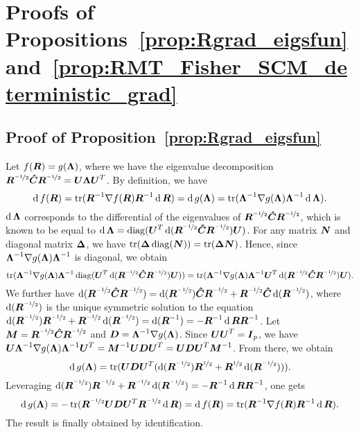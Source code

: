 \section{Proofs of Propositions~\ref{prop:Rgrad_eigsfun} and~\ref{prop:RMT_Fisher_SCM_deterministic_grad}}
\label{app:proofs}

\subsection{Proof of Proposition~\ref{prop:Rgrad_eigsfun}}

Let $f(\point) = g(\eigsMat)$, where we have the eigenvalue decomposition $\point^{\nicefrac{-1}2}\SCM\point^{\nicefrac{-1}2}=\MAT{U}\eigsMat\MAT{U}^T$.
By definition, we have
$$
    \diff f(\point) = \tr(\point^{-1}\grad f(\point)\point^{-1}\diff\point)
    = \diff g(\eigsMat) = \tr(\eigsMat^{-1}\grad g(\eigsMat)\eigsMat^{-1}\diff\eigsMat).
$$
$\diff\eigsMat$ corresponds to the differential of the eigenvalues of $\point^{\nicefrac{-1}2}\SCM\point^{\nicefrac{-1}2}$, which is known to be equal to $\diff\eigsMat=\diag(\MAT{U}^T\diff(\point^{\nicefrac{-1}2}\SCM\point^{\nicefrac{-1}2})\MAT{U})$.
For any matrix $\MAT{N}$ and diagonal matrix $\MAT{\Delta}$, we have $\tr(\MAT{\Delta}\diag(\MAT{N})) = \tr(\MAT{\Delta}\MAT{N})$.
Hence, since $\eigsMat^{-1}\grad g(\eigsMat)\eigsMat^{-1}$ is diagonal, we obtain
$$
     \tr(\eigsMat^{-1}\grad g(\eigsMat)\eigsMat^{-1}\diag(\MAT{U}^T\diff(\point^{\nicefrac{-1}2}\SCM\point^{\nicefrac{-1}2})\MAT{U}))
     =
     \tr(\eigsMat^{-1}\grad g(\eigsMat)\eigsMat^{-1}\MAT{U}^T\diff(\point^{\nicefrac{-1}2}\SCM\point^{\nicefrac{-1}2})\MAT{U}).
$$
We further have
$\diff(\point^{\nicefrac{-1}2}\SCM\point^{\nicefrac{-1}2})=\diff(\point^{\nicefrac{-1}2})\SCM\point^{\nicefrac{-1}2} + \point^{\nicefrac{-1}2}\SCM\diff(\point^{\nicefrac{-1}2})$,
where $\diff(\point^{\nicefrac{-1}2})$ is the unique symmetric solution to the equation
$\diff(\point^{\nicefrac{-1}2})\point^{\nicefrac{-1}2} + \point^{\nicefrac{-1}2}\diff(\point^{\nicefrac{-1}2}) = \diff(\point^{-1})=-\point^{-1}\diff\point\point^{-1}$.
%
Let $\MAT{M}=\point^{\nicefrac{-1}2}\SCM\point^{\nicefrac{-1}2}$ and $\MAT{D} = \eigsMat^{-1}\grad g(\eigsMat)$.
Since $\MAT{U}\MAT{U}^T=\eye$, we have $\MAT{U}\eigsMat^{-1}\grad g(\eigsMat)\eigsMat^{-1}\MAT{U}^T=\MAT{M}^{-1}\MAT{U}\MAT{D}\MAT{U}^T=\MAT{U}\MAT{D}\MAT{U}^T\MAT{M}^{-1}$.
From there, we obtain
$$
    \diff g(\eigsMat) =
    \tr(\MAT{U}\MAT{D}\MAT{U}^T(\diff(\point^{\nicefrac{-1}2})\point^{\nicefrac12} + \point^{\nicefrac12}\diff(\point^{\nicefrac{-1}2}))).
$$
Leveraging $\diff(\point^{\nicefrac{-1}2})\point^{\nicefrac{-1}2} + \point^{\nicefrac{-1}2}\diff(\point^{\nicefrac{-1}2}) = -\point^{-1}\diff\point\point^{-1}$, one gets
$$
    \diff g(\eigsMat) = -\tr(\point^{\nicefrac{-1}2}\MAT{U}\MAT{D}\MAT{U}^T\point^{\nicefrac{-1}2}\diff\point) =
    \diff f(\point) = \tr(\point^{-1}\grad f(\point)\point^{-1}\diff\point).
$$
The result is finally obtained by identification.



